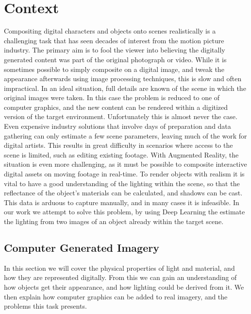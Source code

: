 \documentclass[ %
                    author={Gavin Parker},
                supervisor={Dr. Neill Campbell},
                    degree={MEng},
                     title={Deep Siamese Networks for Illumination Estimation from Stereo Images},
                  subtitle={},
                      type={research},
                      year={2018} ]{dissertation}
\begin{document}
\chapter{Context}
\label{chap:context}
Compositing digital characters and objects onto scenes realistically is a challenging task that has seen decades of interest from the motion picture industry. The primary aim is to fool the viewer into believing the digitally generated content was part of the original photograph or video. While it is sometimes possible to simply composite on a digital image, and tweak the appearance afterwards using image processing techniques, this is slow and often impractical. In an ideal situation, full details are known of the scene in which the original images were taken. In this case the problem is reduced to one of computer graphics, and the new content can be rendered within a digitized version of the target environment. Unfortunately this is almost never the case. Even expensive industry solutions that involve days of preparation and data gathering can only estimate a few scene parameters, leaving much of the work for digital artists. This results in great difficulty in scenarios where access to the scene is limited, such as editing existing footage. With Augmented Reality, the situation is even more challenging, as it must be possible to  composite interactive digital assets on moving footage in real-time.
\newline
To render objects with realism it is vital to have a good understanding of the lighting within the scene, so that the reflectance of the object's materials can be calculated, and shadows can be cast. This data is arduous to capture manually, and in many cases it is infeasible. In our work we attempt to solve this problem, by using Deep Learning the estimate the lighting from two images of an object already within the target scene.

\section{Computer Generated Imagery}
In this section we will cover the physical properties of light and material, and how they are represented digitally. From this we can gain an understanding of how objects get their appearance, and how lighting could be derived from it. We then explain how computer graphics can be added to real imagery, and the problems this task presents.
\end{document}
